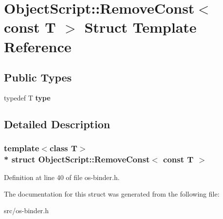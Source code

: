 \hypertarget{struct_object_script_1_1_remove_const_3_01const_01_t_01_4}{}\section{Object\+Script\+:\+:Remove\+Const$<$ const T $>$ Struct Template Reference}
\label{struct_object_script_1_1_remove_const_3_01const_01_t_01_4}
\subsection*{Public Types}
\begin{DoxyCompactItemize}
\item 
typedef T {\bfseries type}\hypertarget{struct_object_script_1_1_remove_const_3_01const_01_t_01_4_a57fcff1880a4f85b9cba1c63b32a022c}{}\label{struct_object_script_1_1_remove_const_3_01const_01_t_01_4_a57fcff1880a4f85b9cba1c63b32a022c}

\end{DoxyCompactItemize}


\subsection{Detailed Description}
\subsubsection*{template$<$class T$>$\\*
struct Object\+Script\+::\+Remove\+Const$<$ const T $>$}



Definition at line 40 of file os-\/binder.\+h.



The documentation for this struct was generated from the following file\+:\begin{DoxyCompactItemize}
\item 
src/os-\/binder.\+h\end{DoxyCompactItemize}
